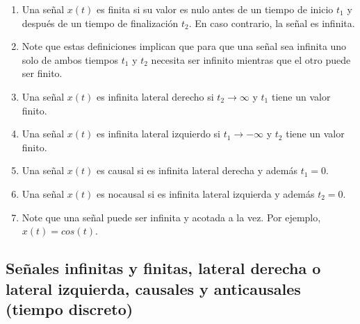 \begin{enumerate}
\item Una se\~{n}al $x(t)$ es finita si su valor es nulo antes de un
  tiempo de inicio $t_{1}$ y despu\'{e}s de un tiempo de
  finalizaci\'{o}n $t_{2}$. En caso contrario, la se\~{n}al es
  infinita.

\item Note que estas definiciones implican que para que una se\~{n}al
  sea infinita uno solo de ambos tiempos $t_{1}$ y $t_{2}$ necesita
  ser infinito mientras que el otro puede ser finito.
        
\item Una se\~{n}al $x(t)$ es infinita lateral derecho si $t_{2}
  \rightarrow \infty$ y $t_{1}$ tiene un valor finito.
        
\item Una se\~{n}al $x(t)$ es infinita lateral izquierdo si $t_{1}
  \rightarrow -\infty$ y $t_{2}$ tiene un valor finito.
        
\item Una se\~{n}al $x(t)$ es causal si es infinita lateral derecha y
  adem\'{a}s $t_{1} = 0$.
        
\item Una se\~{n}al $x(t)$ es nocausal si es infinita lateral
  izquierda y adem\'{a}s $t_{2} = 0$.

\item Note que una se\~{n}al puede ser infinita y acotada a la vez.
  Por ejemplo, $x(t) = cos(t)$.
\end{enumerate}

\subsection{Se\~{n}ales infinitas y finitas, lateral derecha o lateral
  izquierda, causales y anticausales (tiempo discreto)}

